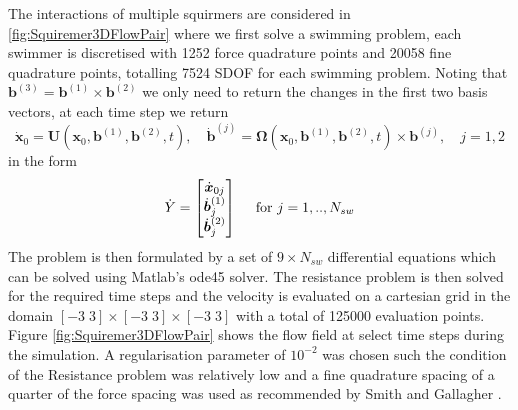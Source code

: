The interactions of multiple squirmers are considered in \cref{fig:Squiremer3DFlowPair} where we first solve a swimming problem, each swimmer is discretised with 1252 force quadrature points and 20058 fine quadrature points, totalling 7524 SDOF for each swimming problem. Noting that $\bm{b}^{(3)} = \bm{b}^{(1)} \times \bm{b}^{(2)}$ we only need to return the changes in the first two basis vectors, at each time step we return 
\begin{equation*}
    {\dot{\bm{x}}}_{0}=\bm{U}\left(\bm{x}_{0}, \bm{b}^{(1)}, \bm{b}^{(2)}, t\right), \quad \dot{\bm{b}}^{(j)}=\bm{\Omega}\left(\bm{x}_{0}, \bm{b}^{(1)}, \bm{b}^{(2)}, t\right) \times \bm{b}^{(j)}, \quad j=1,2
\end{equation*}
in the form
\begin{equation*}
\arraycolsep=0.4pt\def\arraystretch{1}
\dot{Y} = \begin{bmatrix}
    {\dot{\bm{x}}_{0 j}} \\
    {\dot{\bm{b}}^{(1)}}_j \\
    {\dot{\bm{b}}^{(2)}}_j
\end{bmatrix} \quad \text{ for } j=1,..,N_{sw}
\end{equation*}
The problem is then formulated by a set of $9 \times N_{sw}$ differential equations which can be solved using Matlab's ode45 solver. The resistance problem is then solved for the required time steps and the velocity is evaluated on a cartesian grid in the domain $[-3\; 3] \times [-3\; 3] \times [-3\; 3]$ with a total of 125000 evaluation points. Figure \ref{fig:Squiremer3DFlowPair} shows the flow field at select time steps during the simulation. A regularisation parameter of $10^{-2}$ was chosen such the condition of the Resistance problem was relatively low and a fine quadrature spacing of a quarter of the force spacing was used as recommended by Smith and Gallagher \cite{Gallagher2020}.  

